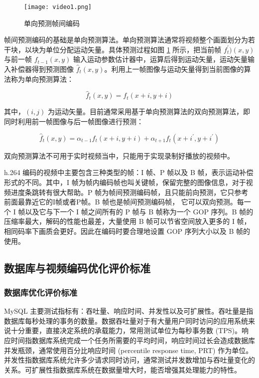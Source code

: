 \begin{figure}[!ht]
    \centering
    \texttt{[image: video1.png]}
    \caption{单向预测帧间编码}
    \label{fig:video1}
\end{figure}

帧间预测编码的基础是单向预测算法。单向预测算法通常将视频整个画面划分为若干块，以块为单位分配运动矢量\cite{毕厚杰2005新一代视频压缩编码标准}。具体预测过程如图 \ref{fig:video1} 所示，把当前帧 $f_{t}^{'})(x,y) $ 与前一帧 $f_{t-1}(x,y)$ 输入运动参数估计器中，运算后得到运动矢量，运动矢量输入补偿器得到预测图像 $\hat{f}_{t}(x,y)$。利用上一帧图像与运动矢量得到当前图像的算法称为单向预测算法：

\begin{equation}
\label{eq:forward_pre}
\hat{f}_{t}(x,y) = f_{t}(x+i, y+i)
\end{equation}

其中，$(i, j)$ 为运动矢量。目前通常采用基于单向预测算法的双向预测算法，即同时利用前一帧图像与后一帧图像进行预测：

\begin{equation}
\label{eq:forward_back_pre}
\hat{f}_{t}(x,y) = \alpha_{t-1}f_{t}(x+i, y+i) + \alpha_{t+1}f_{t}(x+i^{'}, y+i^{'})
\end{equation}

双向预测算法不可用于实时视频当中，只能用于实现录制好播放的视频中。

h.264 编码的视频中主要包含三种类型的帧：I 帧、P 帧以及 B 帧，表示运动补偿形式的不同。其中，I 帧为帧内编码帧也叫关键帧，保留完整的图像信息，对于视频进度条跳转有很大帮助。P 帧为帧间预测编码帧，且只能前向预测，它只参考前面最靠近它的I帧或者P帧。B 帧也是帧间预测编码帧， 它可以双向预测。每一个 I 帧以及它与下一个 I 帧之间所有的 P 帧与 B 帧称为一个 GOP 序列。B 帧的压缩率最大，解码的性能也最差，大量使用 B 帧可以节省空间放入更多的 I 帧，相同码率下画质会更好。因此在编码时要合理地设置 GOP 序列大小以及 B 帧的使用\cite{richardson2004h}。

\subsection{数据库与视频编码优化评价标准}
\subsubsection{数据库优化评价标准}
MySQL 主要测试指标有：吞吐量、响应时间、并发性以及可扩展性。吞吐量是指数据库每秒处理的事务的数量。数据吞吐量对于有大量用户同时访问的应用系统来说十分重要，直接决定系统的承载能力，常用测试单位为每秒事务数 (TPS)。响应时间指数据库系统完成一个任务所需要的平均时间，响应时间过长会造成数据库并发瓶颈，通常使用百分比响应时间 (percentile response time, PRT) 作为单位。并发性指数据库系统允许多少请求同时访问，通常测试并发数增加与吞吐量变化的关系。可扩展性指数据库系统在数据量增大时，能否增强其处理能力的特性\cite{schwartz2012high}。

